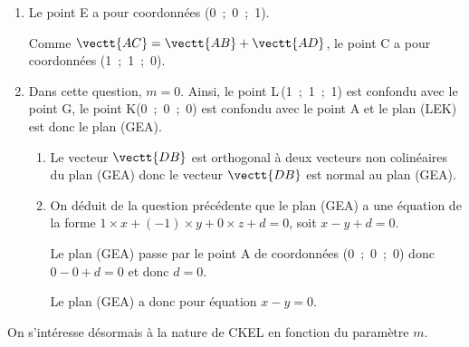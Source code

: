 \begin{enumerate}
\item Le point E a pour coordonnées (0~;~0~;~1).

Comme $\vectt{AC}=\vectt{AB}+\vectt{AD}$, le point C a pour coordonnées (1~;~1~;~0).

\item Dans cette question, $m = 0$. Ainsi, le point L\,(1~;~1~;~1) est confondu avec le point G, le point K(0~;~0~;~0) est confondu avec le point A et le plan (LEK) est donc le plan (GEA).
	\begin{enumerate}
		\item %
		
Le vecteur $\vectt{DB}$	est orthogonal à deux vecteurs non colinéaires du plan (GEA) donc le vecteur $\vectt{DB}$ est normal au plan (GEA).
		
		\item %
On déduit de la question précédente que le plan (GEA) a une équation de la forme $1\times x + (-1)\times y + 0\times z + d =0$, soit $x-y+d=0$.

Le plan (GEA) passe par le point A de coordonnées (0~;~0~;~0) donc $0-0+d=0$ et donc $d=0$.

Le plan (GEA) a donc pour équation $x-y=0$.
	\end{enumerate}
\end{enumerate}

On s'intéresse désormais à la nature de CKEL en fonction du paramètre $m$.

